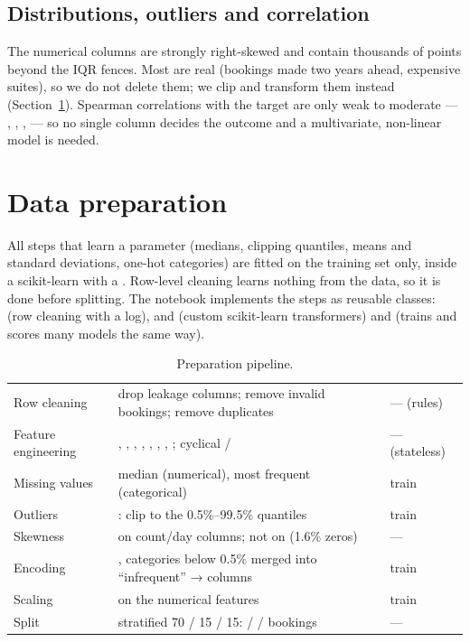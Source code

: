 \subsection{Distributions, outliers and correlation}
The numerical columns are strongly right-skewed and contain thousands of points beyond the IQR fences. Most are real
(bookings made two years ahead, expensive suites), so we do not delete them; we clip and transform them instead
(Section~\ref{tb:prep}). Spearman correlations with the target are only weak to moderate — 
\TBRhoLead,  \TBRhoPrevCancel,  \TBRhoSpecial,
 \TBRhoParking{} — so no single column decides the outcome and a multivariate,
non-linear model is needed.

\section{Data preparation}\label{tb:prep}
All steps that learn a parameter (medians, clipping quantiles, means and standard deviations, one-hot categories) are
fitted on the training set only, inside a scikit-learn  with a . Row-level cleaning
learns nothing from the data, so it is done before splitting. The notebook implements the steps as reusable classes:
 (row cleaning with a log),  and  (custom scikit-learn
transformers) and  (trains and scores many models the same way).

\begin{table}[H]\centering\small
\caption{Preparation pipeline.}\label{tb:tab-pipeline}
\begin{tabularx}{\linewidth}{L{2.9cm}YL{2.2cm}}
\toprule {} &  &  \\ \midrule
Row cleaning & drop leakage columns; remove invalid bookings; remove \TBDupRemoved{} duplicates & — (rules) \\
Feature engineering & , , , , , , , ; cyclical / & — (stateless) \\
Missing values & median (numerical), most frequent (categorical) & train \\
Outliers & : clip to the 0.5\%–99.5\% quantiles & train \\
Skewness &  on count/day columns; not on  (1.6\% zeros) & — \\
Encoding & , categories below 0.5\% merged into ``infrequent'' → \TBNOneHot{} columns & train \\
Scaling &  on the \TBNNumeric{} numerical features & train \\
Split & stratified 70 / 15 / 15: \TBTrain{} / \TBVal{} / \TBTest{} bookings & — \\
\bottomrule
\end{tabularx}
\end{table}

